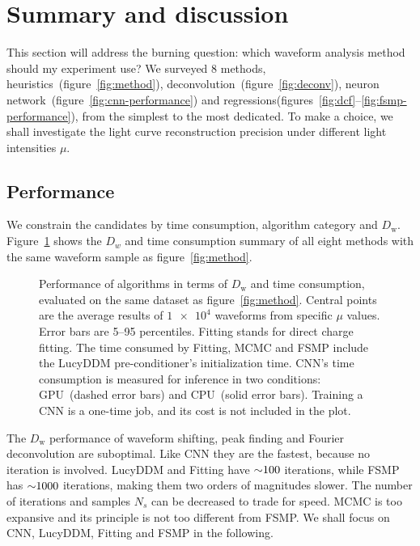\section{Summary and discussion}
\label{sec:discussion}

This section will address the burning question: which waveform analysis method should my experiment use?  We surveyed 8 methods, heuristics~(figure~\ref{fig:method}), deconvolution~(figure~\ref{fig:deconv}), neuron network~(figure~\ref{fig:cnn-performance}) and regressions(figures~\ref{fig:dcf}--\ref{fig:fsmp-performance}), from the simplest to the most dedicated.  To make a choice, we shall investigate the light curve reconstruction precision under different light intensities $\mu$.

\subsection{Performance}

We constrain the candidates by time consumption, algorithm category and $D_\mathrm{w}$.  Figure~\ref{fig:chargesummary} shows the $D_w$ and time consumption summary of all eight methods with the same waveform sample as figure~\ref{fig:method}.
\begin{figure}[H]
    \centering
    \resizebox{\textwidth}{!}{}
    \caption{\label{fig:chargesummary} Performance of algorithms in terms of $D_\mathrm{w}$ and time consumption, evaluated on the same dataset as figure~\ref{fig:method}. Central points are the average results of $\num[retain-unity-mantissa=false]{1e4}$ waveforms from specific $\mu$ values.  Error bars are 5--95 percentiles.  Fitting stands for direct charge fitting. The time consumed by Fitting, MCMC and FSMP include the LucyDDM pre-conditioner's initialization time.  CNN's time consumption is measured for inference in two conditions: GPU\protect\footnotemark~(dashed error bars) and CPU\protect\footnotemark~(solid error bars).  Training a CNN is a one-time job, and its cost is not included in the plot.}
\end{figure}
\addtocounter{footnote}{-2}

The $D_\mathrm{w}$ performance of waveform shifting, peak finding and Fourier deconvolution are suboptimal.  Like CNN they are the fastest, because no iteration is involved.  LucyDDM and Fitting have $\num{\sim 100}$ iterations, while FSMP has $\num{\sim 1000}$ iterations, making them two orders of magnitudes slower.  The number of iterations and samples $N_s$ can be decreased to trade for speed.  MCMC is too expansive and its principle is not too different from FSMP.  We shall focus on CNN, LucyDDM, Fitting and FSMP in the following.  

